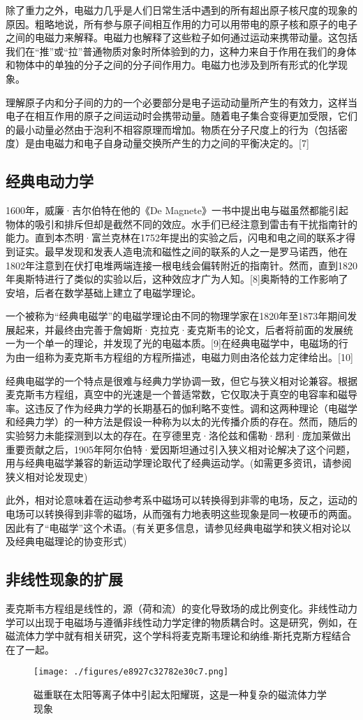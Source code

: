 除了重力之外，电磁力几乎是人们日常生活中遇到的所有超出原子核尺度的现象的原因。粗略地说，所有参与原子间相互作用的力可以用带电的原子核和原子的电子之间的电磁力来解释。电磁力也解释了这些粒子如何通过运动来携带动量。这包括我们在“推”或“拉”普通物质对象时所体验到的力，这种力来自于作用在我们的身体和物体中的单独的分子之间的分子间作用力。电磁力也涉及到所有形式的化学现象。

理解原子内和分子间的力的一个必要部分是电子运动动量所产生的有效力，这样当电子在相互作用的原子之间运动时会携带动量。随着电子集合变得更加受限，它们的最小动量必然由于泡利不相容原理而增加。物质在分子尺度上的行为（包括密度）是由电磁力和电子自身动量交换所产生的力之间的平衡决定的。[7]
\subsection{经典电动力学}
1600年，威廉·吉尔伯特在他的《De Magnete》一书中提出电与磁虽然都能引起物体的吸引和排斥但却是截然不同的效应。水手们已经注意到雷击有干扰指南针的能力。直到本杰明·富兰克林在1752年提出的实验之后，闪电和电之间的联系才得到证实。最早发现和发表人造电流和磁性之间的联系的人之一是罗马诺西，他在1802年注意到在伏打电堆两端连接一根电线会偏转附近的指南针。然而，直到1820年奥斯特进行了类似的实验以后，这种效应才广为人知。[8]奥斯特的工作影响了安培，后者在数学基础上建立了电磁学理论。

一个被称为“经典电磁学”的电磁学理论由不同的物理学家在1820年至1873年期间发展起来，并最终由完善于詹姆斯·克拉克·麦克斯韦的论文，后者将前面的发展统一为一个单一的理论，并发现了光的电磁本质。[9]在经典电磁学中，电磁场的行为由一组称为麦克斯韦方程组的方程所描述，电磁力则由洛伦兹力定律给出。[10]

经典电磁学的一个特点是很难与经典力学协调一致，但它与狭义相对论兼容。根据麦克斯韦方程组，真空中的光速是一个普适常数，它仅取决于真空的电容率和磁导率。这违反了作为经典力学的长期基石的伽利略不变性。调和这两种理论（电磁学和经典力学）的一种方法是假设一种称为以太的光传播介质的存在。然而，随后的实验努力未能探测到以太的存在。在亨德里克·洛伦兹和儒勒·昂利·庞加莱做出重要贡献之后，1905年阿尔伯特·爱因斯坦通过引入狭义相对论解决了这个问题，用与经典电磁学兼容的新运动学理论取代了经典运动学。(如需更多资讯，请参阅狭义相对论发现史)

此外，相对论意味着在运动参考系中磁场可以转换得到非零的电场，反之，运动的电场可以转换得到非零的磁场，从而强有力地表明这些现象是同一枚硬币的两面。因此有了“电磁学”这个术语。(有关更多信息，请参见经典电磁学和狭义相对论以及经典电磁理论的协变形式)
\subsection{非线性现象的扩展}
麦克斯韦方程组是线性的，源（荷和流）的变化导致场的成比例变化。非线性动力学可以出现于电磁场与遵循非线性动力学定律的物质耦合时。这是研究，例如，在磁流体力学中就有相关研究，这个学科将麦克斯韦理论和纳维-斯托克斯方程结合在了一起。
\begin{figure}[ht]
\centering
\texttt{[image: ./figures/e8927c32782e30c7.png]}
\caption{磁重联在太阳等离子体中引起太阳耀斑，这是一种复杂的磁流体力学现象} \label{fig_DCXHZY_5}
\end{figure}
